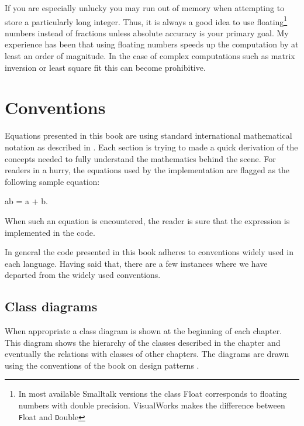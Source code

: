 If you are especially unlucky you may run out of memory when
attempting to store a particularly long integer. Thus, it is
always a good idea to use floating\footnote{In most available
Smalltalk versions the class Float corresponds to floating numbers
with double precision. VisualWorks makes the difference between
{\texttt Float} and {\texttt Double}} numbers instead of fractions unless
absolute accuracy is your primary goal. My experience has been
that using floating numbers speeds up the computation by at least
an order of magnitude. In the case of complex computations such as
matrix inversion or least square fit this can become prohibitive.

\section{Conventions}
Equations presented in this book are using standard international
mathematical notation as described in \cite{Knuth1}. Each section
is trying to made a quick derivation of the concepts needed to
fully understand the mathematics behind the scene. For readers in
a hurry, the equations used by the implementation are flagged as
the following sample equation:
\begin{mainEquation}
\ln ab = \ln a + \ln b.
\end{mainEquation}
When such an equation is encountered, the reader is sure that the
expression is implemented in the code.

In general the code presented in this book adheres to conventions
widely used in each language. Having said that, there are a few
instances where we have departed from the widely used conventions.

\subsection{Class diagrams}
When appropriate a class diagram is shown at the beginning of each
chapter. This diagram shows the hierarchy of the classes described
in the chapter and eventually the relations with classes of other
chapters. The diagrams are drawn using the conventions of the book
on design patterns \cite{GoF}.

